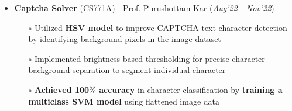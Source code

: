 \documentclass[10.8pt, a4paper]{extarticle}
\begin{document}
\begin{itemize}
  \item \href{https://github.com/Vinay-Agrawal29/Captcha-Solver-CS771} {\textbf{Captcha Solver}} (CS771A) | Prof. Purushottam Kar  \hfill\hfill(\textit{Aug'22 - Nov'22})
  \begin{itemize}
    \item[$\circ$] Utilized \textbf{HSV model} to improve CAPTCHA text character detection by identifying background pixels in the image dataset \\[-0.6cm]
    \item[$\circ$] Implemented brightness-based thresholding for precise character-background separation to segment individual character\\[-0.6cm]
    \item[$\circ$] \textbf{Achieved 100$\%$ accuracy} in character classification by \textbf{training a multiclass SVM model} using flattened image data\\[-0.6cm]
  \end{itemize}
  \vspace{0.055cm}

\end{itemize}
\end{document}
